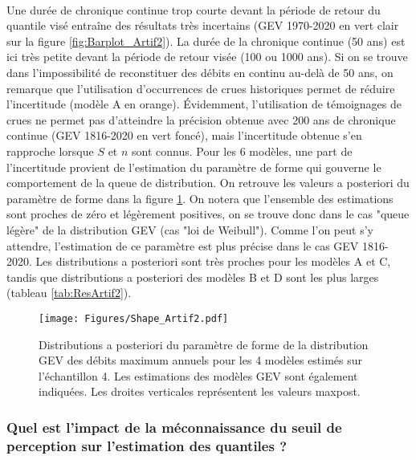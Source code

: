\documentclass[11pt]{article}
\begin{document}
	\paragraph{} Une durée de chronique continue trop courte devant la période de retour du quantile visé entraîne des résultats très incertains (GEV 1970-2020 en vert clair sur la figure \ref{fig:Barplot_Artif2}). La durée de la chronique continue (50 ans) est ici très petite devant la période de retour visée (100 ou 1000 ans). Si on se trouve dans l'impossibilité de reconstituer des débits en continu au-delà de 50 ans, on remarque que l'utilisation d'occurrences de crues historiques permet de réduire l'incertitude (modèle A en orange). Évidemment, l'utilisation de témoignages de crues ne permet pas d'atteindre la précision obtenue avec 200 ans de chronique continue (GEV 1816-2020 en vert foncé), mais l'incertitude obtenue s'en rapproche lorsque $S$ et $n$ sont connus. Pour les 6 modèles, une part de l'incertitude provient de l'estimation du paramètre de forme qui gouverne le comportement de la queue de distribution. On retrouve les valeurs a posteriori du paramètre de forme dans la figure \ref{fig:Shape_Artif2}. On notera que l'ensemble des estimations sont proches de zéro et légèrement positives, on se trouve donc dans le cas "queue légère" de la distribution GEV (cas "loi de Weibull"). Comme l'on peut s'y attendre, l'estimation de ce paramètre est plus précise dans le cas GEV 1816-2020. Les distributions a posteriori sont très proches pour les modèles A et C, tandis que distributions a posteriori des modèles B et D sont les plus larges (tableau \ref{tab:ResArtif2}). 
	
	\begin{figure}[h]
		\centering
		\texttt{[image: Figures/Shape\_Artif2.pdf]}	
		\caption{Distributions a posteriori du paramètre de forme de la distribution GEV des débits maximum annuels pour les 4 modèles estimés sur l'échantillon 4. Les estimations des modèles GEV sont également indiquées. Les droites verticales représentent les valeurs maxpost.}
		\label{fig:Shape_Artif2}
	\end{figure}

\FloatBarrier
	
	\subsubsection{Quel est l'impact de la méconnaissance du seuil de perception sur l'estimation des quantiles ?}
	
\end{document}
